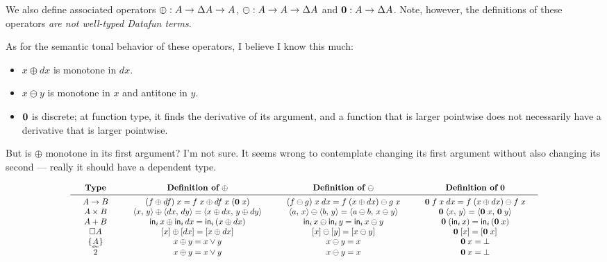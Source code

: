 \documentclass{article}
\theoremstyle{plain}
\theoremstyle{definition}
\begin{document}
We also define associated operators $\oplus : A \to \Delta A \to A$, $\ominus : A
\to A \to \Delta A$ and $\mathbf{0} : A \to \Delta A$. Note, however, the
definitions of these operators \emph{are not well-typed Datafun terms}. 

As for the semantic tonal behavior of these operators, I believe I know this
much:
\begin{itemize}
\item $x \oplus dx$ is monotone in $dx$.
\item $x \ominus y$ is monotone in $x$ and antitone in $y$.
\item $\mathbf{0}$ is discrete; at function type, it finds the derivative of its
  argument, and a function that is larger pointwise does not necessarily have a
  derivative that is larger pointwise.
\end{itemize}

But is $\oplus$ monotone in its first argument? I'm not sure. It seems wrong to
contemplate changing its first argument without also changing its second ---
really it should have a dependent type.

\begin{center}
\[
\scalebox{0.85}{\(
\arraycolsep=1.5em
\begin{array}{cccc}
  \textbf{Type}
  & {\textbf{Definition of}~\oplus}
  & {\textbf{Definition of}~\ominus}
  & {\textbf{Definition of}~\zero}
  \\ \midrule
  A \to B
  & (f \oplus df)\; x = f\; x \oplus df\; x\; (\zero\; x)
  & (f \ominus g)\; x \;dx = f\; (x \oplus dx) \ominus g \; x
  & \zero\; f\; x\; dx = f\; (x \oplus dx) \ominus f\; x
  \\
  A \x B
  & \pair{x}{y} \oplus \pair{dx}{dy} = \pair{x \oplus dx}{y \oplus dy}
  & \pair{a}{x} \ominus \pair{b}{y} = \pair{a \ominus b}{x \ominus y}
  & \zero \; \pair{x}{y} = \pair{\zero\; x}{\zero\; y}
  \\
  A + B
  & \inj{i}{x} \oplus \inj{i}{dx} = \inj{i}{(x \oplus dx)}
  & \inj{i}{x} \ominus \inj{i}{y} = \inj{i}{x \ominus y}
  & \zero\; (\inj{i}{x}) = \inj{i}{(\zero\;x)}
  \\
  \Disc{A}
  & \disc{x} \oplus \disc{dx} = \disc{x \oplus dx}
  & \disc{x} \ominus \disc{y} = \disc{x \ominus y}
  & \zero\; \disc{x} = \disc{\zero\; x}
  \\
  \Seteq{A}
  & x \oplus y = x \vee y
  & x \ominus y = x
  & \zero\; x = \unit
  \\
  \tbool
  & x \oplus y = x \vee y
  & x \ominus y = x
  & \zero\; x = \unit
\end{array}
\)}
\]
\end{center}
\end{document}
